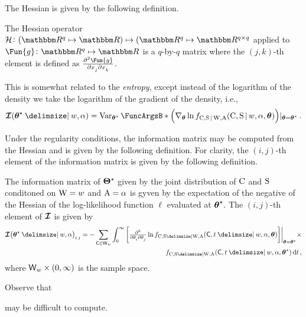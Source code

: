 \documentclass[
    11pt,
    extrafontsizes,
    article,
    oldfontcommands,
    final,
    oneside,
    openany,
    hidelinks]{memoir}
\begin{document}
The Hessian is given by the following definition.
\begin{definition}
The Hessian operator $\hessian \colon (\RealSet^q \mapsto \RealSet) \mapsto (\RealSet^q \mapsto \RealSet^{q \times q}$ applied to $\Fun{g} \colon \RealSet^q \mapsto \RealSet$ is a $q$-by-$q$ matrix where the $(j,k)$-th element is defined as $\md{\Fun{g}}{2}{x_j}{}{x_k}{}$.
\end{definition}


This is somewhat related to the \emph{entropy}, except instead of the logarithm of the density we take the logarithm of the gradient of the density, i.e.,
\begin{equation}
\infomatrx(\tparam\sysparamvec \Given w, \alpha)
= \Var{\left(\nabla_{\sysparamvec} \ln \pdf_{\rvcand,\sv \given \RV{W}, \RV{A}}(\rvcand,\sv \given w,\alpha,\sysparamvec)\right) \rvert_{\sysparamvec=\tparam\sysparamvec}}[\tparam\sysparamvec]\,.
\end{equation}

Under the regularity conditions, the information matrix may be computed from the Hessian and is given by the following definition.
For clarity, the $(i,j)$-th element of the information matrix is given by the following definition.
\begin{definition}
The information matrix of ${\boldsymbol{\Theta}}^{\star}$ given by the joint distribution of $\mathrm{C}$ and $\mathrm{S}$ conditoned on $\mathrm{W} = w$ and $\mathrm{A} = \alpha$ is gyven by the expectation of the negative of the Hessian of the log-likelihood function $\ell$ evaluated at ${\boldsymbol{\mathbf{\theta}}}^{\star}$.
The $(i,j)$-th element of $\operatorname{\boldsymbol{\mathcal{I}}}$ is given by
\begin{equation}
\begin{split}
\label{eq:info_matrix_el}
\infomatrx\!\left(\tparam\sysparamvec \Given w, \alpha\right)_{i\,j}
= -\sum_{\cand \in \candsw{w}} \int_{0}^{\infty}
{
	\biggl[
	\md{}{2}{\paramv_i}{}{\paramv_j}{}
	\ln \pdf_{\rvcand,\sv \Given \RV{W},\RV{A}}(\cand, t \Given w, \alpha, \sysparamvec)
	\biggr]
}
\bigg \rvert_{\sysparamvec=\tparam\sysparamvec} \times\\
\qquad \pdf_{\rvcand,\sv \Given \RV{W},\RV{A}}(\cand, t \Given w, \alpha, \tparam\sysparamvec) \dif t\,,
\end{split}
\end{equation}
where $\candsw{w} \times (0,\infty)$ is the sample space.
\end{definition}

Observe that 

 may be difficult to compute.
\end{document}
